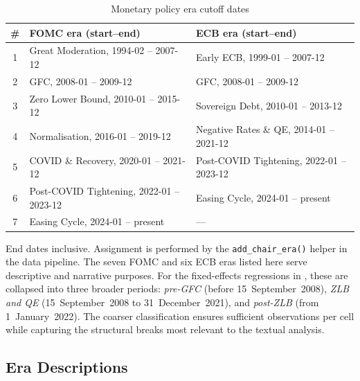 \begin{table}[htbp]
\centering
\caption{Monetary policy era cutoff dates}
\label{tab:era_dates}
\begin{threeparttable}
\begin{tabular}{cll}
\toprule
\# & FOMC era (start--end) & ECB era (start--end) \\
\midrule
1 & Great Moderation, 1994-02 -- 2007-12     & Early ECB, 1999-01 -- 2007-12 \\
2 & GFC, 2008-01 -- 2009-12                  & GFC, 2008-01 -- 2009-12 \\
3 & Zero Lower Bound, 2010-01 -- 2015-12     & Sovereign Debt, 2010-01 -- 2013-12 \\
4 & Normalisation, 2016-01 -- 2019-12        & Negative Rates \& QE, 2014-01 -- 2021-12 \\
5 & COVID \& Recovery, 2020-01 -- 2021-12    & Post-COVID Tightening, 2022-01 -- 2023-12 \\
6 & Post-COVID Tightening, 2022-01 -- 2023-12 & Easing Cycle, 2024-01 -- present \\
7 & Easing Cycle, 2024-01 -- present         & --- \\
\bottomrule
\end{tabular}
\begin{tablenotes}\footnotesize
  \item[] End dates inclusive. Assignment is performed by the
    \texttt{add\_chair\_era()} helper in the data pipeline. The
    seven FOMC and six ECB eras listed here serve descriptive and
    narrative purposes. For the fixed-effects regressions in
    , these are collapsed into three broader
    periods: \emph{pre-GFC} (before 15~September~2008),
    \emph{ZLB and QE} (15~September~2008 to 31~December~2021),
    and \emph{post-ZLB} (from 1~January~2022). The coarser
    classification ensures sufficient observations per cell
    while capturing the structural breaks most relevant to the
    textual analysis.
\end{tablenotes}
\end{threeparttable}
\end{table}


\subsection{Era Descriptions}
\label{sec:inst_eras_descriptions}


